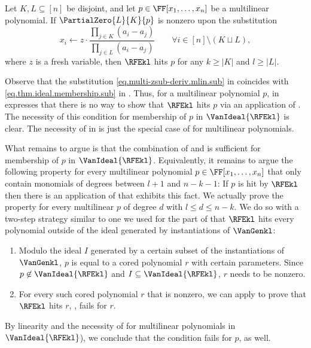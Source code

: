 \begin{lemma}\label{lem.multi-zsub-deriv.mlin}
  Let \(K,L \subseteq [n]\) be disjoint,
  and
  let \(p\in\FF[x_1,\ldots,x_n]\) be a multilinear polynomial.
  If
  \(\PartialZero{L}{K}{p}\)
  is nonzero upon the substitution
  \begin{equation}
    \label{eq.multi-zsub-deriv.mlin.sub}
    x_i \gets
    z \cdot
      \frac{
        \prod_{j\in K} ( a_i - a_{j} )
      }{
        \prod_{j\in L} ( a_i - a_{j} )
      }
      \qquad \forall i\in [n]\setminus (K\sqcup L),
  \end{equation}
  where $z$ is a fresh variable,
  then \(\RFEkl\) hits \(p\) for any \(k\ge|K|\) and \(l\ge|L|\).
\end{lemma}

Observe that the substitution \eqref{eq.multi-zsub-deriv.mlin.sub} in  coincides with \eqref{eq.thm.ideal.membership.sub} in . Thus, for a multilinear polynomial $p$,  in  expresses that there is no way to show that $\RFEkl$ hits $p$ via an application of . The necessity of this condition for membership of $p$ in $\VanIdeal{\RFEkl}$ is clear. 
The necessity of  in  is just the special case of  for multilinear polynomials. 

What remains to argue is that the combination of  and  is sufficient for membership of $p$ in $\VanIdeal{\RFEkl}$. Equivalently, it remains to argue the following property for every multilinear polynomial $p \in \FF[x_1,\dots,x_n]$ that only contain monomials of degrees between $l+1$ and $n-k-1$: If $p$ is hit by $\RFEkl$ then there is an application of  that exhibits this fact. We actually prove the property for every multilinear $p$ of degree $d$ with $l \le d \le n-k$. We do so with a two-step strategy similar to one we used for the part of  that $\RFEkl$ hits every polynomial outside of the ideal generated by instantiations of $\VanGenkl$:
\begin{enumerate}
  \item
    Modulo the ideal $I$ generated by a certain subset of the instantiations of $\VanGenkl$, 
    $p$ is equal
    to a cored polynomial $r$ with certain parameters. Since $p \not\in \VanIdeal{\RFEkl}$ and $I \subseteq \VanIdeal{\RFEkl}$, $r$ needs to be nonzero. 
  \item
    For every such cored polynomial $r$ that is nonzero, we can apply  to prove that $\RFEkl$ hits $r$, \ie,  fails for $r$.
\end{enumerate}
By linearity and the necessity of  for multilinear polynomials in $\VanIdeal{\RFEkl}$), we conclude that the condition fails for $p$, as well.

